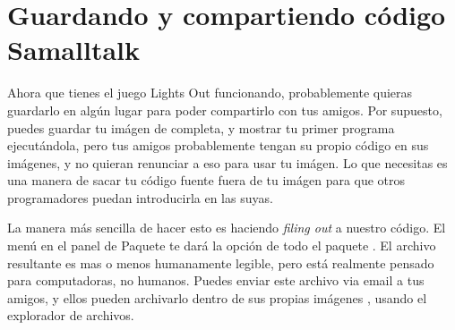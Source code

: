\documentclass[a4paper,10pt,twoside]{book}
\begin{document}
{%
\section{Guardando y compartiendo c\'odigo Samalltalk}

Ahora que tienes el juego Lights Out funcionando, probablemente quieras guardarlo en alg\'un lugar para poder compartirlo con tus amigos. Por supuesto, puedes guardar tu im\'agen de \pharo completa, y mostrar tu primer programa ejecut\'andola, pero tus amigos probablemente tengan su propio c\'odigo en sus im\'agenes, y no quieran renunciar a eso para usar tu im\'agen. 
Lo que necesitas es una manera de sacar tu c\'odigo fuente fuera de tu im\'agen \pharo para que otros programadores puedan introducirla en las suyas. 

La manera m\'as sencilla de hacer esto es haciendo \emph{filing out} a nuestro c\'odigo. El men\'u \actclick en el panel de Paquete te dar\'a la opci\'on  de todo el paquete .
El archivo resultante es mas o menos humanamente legible, pero est\'a realmente pensado para computadoras, no humanos. 
Puedes enviar este archivo via email a tus amigos, y ellos pueden archivarlo dentro de sus propias im\'agenes \pharo, usando el explorador de archivos.

}
\end{document}
